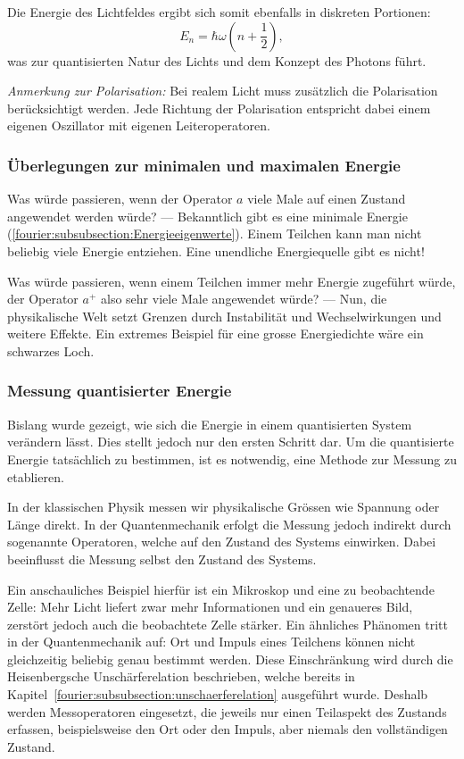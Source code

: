 			Die Energie des Lichtfeldes ergibt sich somit ebenfalls in diskreten Portionen:
			\[
				E_n = \hbar\omega\left(n + \frac{1}{2}\right),
			\]
			was zur quantisierten Natur des Lichts und dem Konzept des Photons führt.

			\textit{Anmerkung zur Polarisation:} Bei realem Licht muss zusätzlich die Polarisation berücksichtigt werden.
			Jede Richtung der Polarisation entspricht dabei einem eigenen Oszillator mit eigenen Leiteroperatoren.

		\subsubsection{Überlegungen zur minimalen und maximalen Energie\label{fourier:subsubsection:MinMaxEnergie}}
			Was würde passieren, wenn der Operator $a$ viele Male auf einen Zustand angewendet werden würde? ---
			Bekanntlich gibt es eine minimale Energie (\ref{fourier:subsubsection:Energieeigenwerte}).
			Einem Teilchen kann man nicht beliebig viele Energie entziehen.
			Eine unendliche Energiequelle gibt es nicht!

			Was würde passieren, wenn einem Teilchen immer mehr Energie zugeführt würde, der Operator $a^+$ also sehr viele Male angewendet würde? ---
			Nun, die physikalische Welt setzt Grenzen durch Instabilität und Wechselwirkungen und weitere Effekte.
			Ein extremes Beispiel für eine grosse Energiedichte wäre ein schwarzes Loch.
		
		\subsubsection{Messung quantisierter Energie\label{fourier:subsubsection:MessungQuantisierterEnergie}}
			Bislang wurde gezeigt, wie sich die Energie in einem quantisierten System verändern lässt.
			Dies stellt jedoch nur den ersten Schritt dar.
			Um die quantisierte Energie tatsächlich zu bestimmen, ist es notwendig, eine Methode zur Messung zu etablieren.

			In der klassischen Physik messen wir physikalische Grössen wie Spannung oder Länge direkt.
			In der Quantenmechanik erfolgt die Messung jedoch indirekt durch sogenannte Operatoren, welche auf den Zustand des Systems einwirken.
			Dabei beeinflusst die Messung selbst den Zustand des Systems.

			Ein anschauliches Beispiel hierfür ist ein Mikroskop und eine zu beobachtende Zelle:
			Mehr Licht liefert zwar mehr Informationen und ein genaueres Bild, zerstört jedoch auch die beobachtete Zelle stärker.
			Ein ähnliches Phänomen tritt in der Quantenmechanik auf:
			Ort und Impuls eines Teilchens können nicht gleichzeitig beliebig genau bestimmt werden.
			Diese Einschränkung wird durch die Heisenbergsche Unschärferelation beschrieben, welche bereits in Kapitel~\ref{fourier:subsubsection:unschaerferelation} ausgeführt wurde.
			Deshalb werden Messoperatoren eingesetzt, die jeweils nur einen Teilaspekt des Zustands erfassen, beispielsweise den Ort oder den Impuls, aber niemals den vollständigen Zustand.


